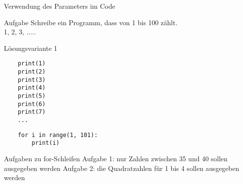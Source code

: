 \begin{frame}[fragile]{Verwendung des Parameters im Code}
\begin{block}{Aufgabe}
    Schreibe ein Programm, dass von 1 bis 100 zählt.\\
   1, 2, 3, .....
\end{block}
\begin{exampleblock}{Lösungsvariante 1}
    \begin{lstlisting}
	print(1)
	print(2)
	print(3)
	print(4)
	print(5)
	print(6)
	print(7)
	...
    \end{lstlisting}
    \pause{}
    \begin{lstlisting}
    for i in range(1, 101):
    	print(i)
    \end{lstlisting}
\end{exampleblock}
\end{frame}

\begin{frame}[fragile]{Aufgaben zu for-Schleifen}
Aufgabe 1: nur Zahlen zwischen 35 und 40 sollen ausgegeben werden
Aufgabe 2: die Quadratzahlen für 1 bis 4 sollen ausgegeben werden 
\end{frame}




